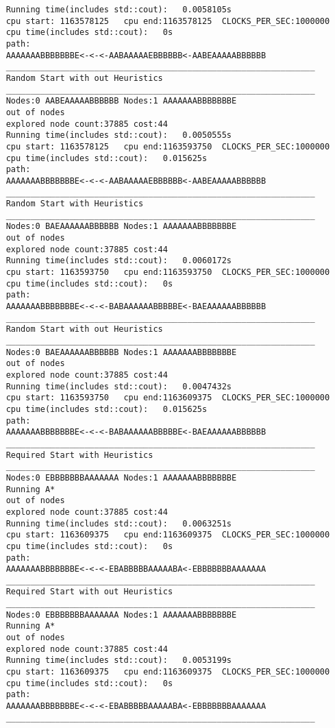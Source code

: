 \documentclass[12pt]{article}
\begin{document}
\begin{lstlisting}
	Running time(includes std::cout):	0.0058105s
	cpu start: 1163578125	cpu end:1163578125	CLOCKS_PER_SEC:1000000
	cpu time(includes std::cout):	0s
	path:
	AAAAAAABBBBBBBE<-<-<-AABAAAAAEBBBBBB<-AABEAAAAABBBBBB
	_______________________________________________________________
	Random Start with out Heuristics
	_______________________________________________________________
	Nodes:0	AABEAAAAABBBBBB Nodes:1	AAAAAAABBBBBBBE
	out of nodes
	explored node count:37885 cost:44
	Running time(includes std::cout):	0.0050555s
	cpu start: 1163578125	cpu end:1163593750	CLOCKS_PER_SEC:1000000
	cpu time(includes std::cout):	0.015625s
	path:
	AAAAAAABBBBBBBE<-<-<-AABAAAAAEBBBBBB<-AABEAAAAABBBBBB
	_______________________________________________________________
	Random Start with Heuristics
	_______________________________________________________________
	Nodes:0	BAEAAAAAABBBBBB Nodes:1	AAAAAAABBBBBBBE
	out of nodes
	explored node count:37885 cost:44
	Running time(includes std::cout):	0.0060172s
	cpu start: 1163593750	cpu end:1163593750	CLOCKS_PER_SEC:1000000
	cpu time(includes std::cout):	0s
	path:
	AAAAAAABBBBBBBE<-<-<-BABAAAAAABBBBBE<-BAEAAAAAABBBBBB
	_______________________________________________________________
	Random Start with out Heuristics
	_______________________________________________________________
	Nodes:0	BAEAAAAAABBBBBB Nodes:1	AAAAAAABBBBBBBE
	out of nodes
	explored node count:37885 cost:44
	Running time(includes std::cout):	0.0047432s
	cpu start: 1163593750	cpu end:1163609375	CLOCKS_PER_SEC:1000000
	cpu time(includes std::cout):	0.015625s
	path:
	AAAAAAABBBBBBBE<-<-<-BABAAAAAABBBBBE<-BAEAAAAAABBBBBB
	_______________________________________________________________
	Required Start with Heuristics
	_______________________________________________________________
	Nodes:0	EBBBBBBBAAAAAAA Nodes:1	AAAAAAABBBBBBBE
	Running A*
	out of nodes
	explored node count:37885 cost:44
	Running time(includes std::cout):	0.0063251s
	cpu start: 1163609375	cpu end:1163609375	CLOCKS_PER_SEC:1000000
	cpu time(includes std::cout):	0s
	path:
	AAAAAAABBBBBBBE<-<-<-EBABBBBBAAAAABA<-EBBBBBBBAAAAAAA
	_______________________________________________________________
	Required Start with out Heuristics
	_______________________________________________________________
	Nodes:0	EBBBBBBBAAAAAAA Nodes:1	AAAAAAABBBBBBBE
	Running A*
	out of nodes
	explored node count:37885 cost:44
	Running time(includes std::cout):	0.0053199s
	cpu start: 1163609375	cpu end:1163609375	CLOCKS_PER_SEC:1000000
	cpu time(includes std::cout):	0s
	path:
	AAAAAAABBBBBBBE<-<-<-EBABBBBBAAAAABA<-EBBBBBBBAAAAAAA
	_______________________________________________________________
\end{lstlisting}
\end{document}
